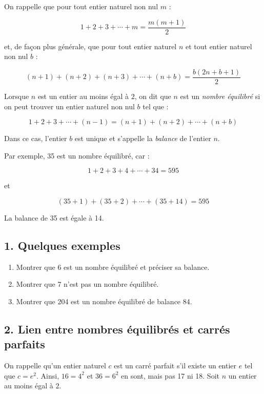 On rappelle que pour tout entier naturel non nul \( m \) :

\[1 + 2 + 3 + \cdots + m = \frac{m(m+1)}{2}\]

et, de façon plus générale, que pour tout entier naturel \( n \) et tout entier naturel non nul \( b \) :

\[(n+1) + (n+2) + (n+3) + \cdots + (n+b) = \frac{b(2n+b+1)}{2}\]

Lorsque \( n \) est un entier au moins égal à \( 2 \), on dit que \( n \) est un \emph{nombre équilibré} si on peut trouver un entier naturel non nul \( b \) tel que :

\[1 + 2 + 3 + \cdots + (n-1) = (n+1) + (n+2) + \cdots + (n+b)\]

Dans ce cas, l'entier \( b \) est unique et s'appelle la \emph{balance} de l'entier \( n \).

Par exemple, 35 est un nombre équilibré, car :

\[1 + 2 + 3 + 4 + \cdots + 34 = 595\]

et

\[(35 + 1) + (35 + 2) + \cdots + (35 + 14) = 595\]

La balance de 35 est égale à 14.

\subsection*{1. Quelques exemples}
\begin{enumerate}
    \item Montrer que 6 est un nombre équilibré et préciser sa balance.
    \item Montrer que 7 n'est pas un nombre équilibré.
    \item Montrer que 204 est un nombre équilibré de balance 84.
\end{enumerate}

\subsection*{2. Lien entre nombres équilibrés et carrés parfaits}

On rappelle qu'un entier naturel \( c \) est un carré parfait s'il existe un entier \( e \) tel que \( c = e^2 \). Ainsi, \( 16 = 4^2 \) et \( 36 = 6^2 \) en sont, mais pas 17 ni 18. Soit \( n \) un entier au moins égal à \( 2 \).

